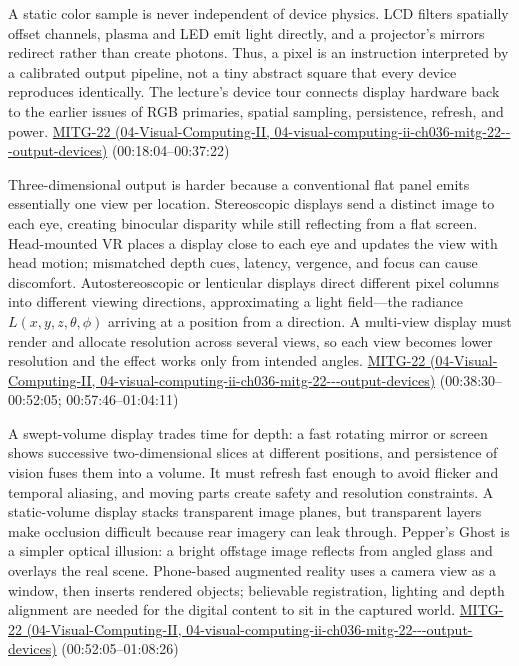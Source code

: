 A static color sample is never independent of device physics. LCD filters spatially offset channels, plasma and LED emit light directly, and a projector's mirrors redirect rather than create photons. Thus, a pixel is an instruction interpreted by a calibrated output pipeline, not a tiny abstract square that every device reproduces identically. The lecture's device tour connects display hardware back to the earlier issues of RGB primaries, spatial sampling, persistence, refresh, and power. \href{../04-Visual-Computing-II/main.pdf\#nameddest=04-visual-computing-ii-ch036-mitg-22---output-devices}{MITG-22 (04-Visual-Computing-II, 04-visual-computing-ii-ch036-mitg-22-\/-\/-output-devices)} (00:18:04--00:37:22)

Three-dimensional output is harder because a conventional flat panel emits essentially one view per location. Stereoscopic displays send a distinct image to each eye, creating binocular disparity while still reflecting from a flat screen. Head-mounted VR places a display close to each eye and updates the view with head motion; mismatched depth cues, latency, vergence, and focus can cause discomfort. Autostereoscopic or lenticular displays direct different pixel columns into different viewing directions, approximating a light field---the radiance \(L(x,y,z,\theta,\phi)\) arriving at a position from a direction. A multi-view display must render and allocate resolution across several views, so each view becomes lower resolution and the effect works only from intended angles. \href{../04-Visual-Computing-II/main.pdf\#nameddest=04-visual-computing-ii-ch036-mitg-22---output-devices}{MITG-22 (04-Visual-Computing-II, 04-visual-computing-ii-ch036-mitg-22-\/-\/-output-devices)} (00:38:30--00:52:05; 00:57:46--01:04:11)

A swept-volume display trades time for depth: a fast rotating mirror or screen shows successive two-dimensional slices at different positions, and persistence of vision fuses them into a volume. It must refresh fast enough to avoid flicker and temporal aliasing, and moving parts create safety and resolution constraints. A static-volume display stacks transparent image planes, but transparent layers make occlusion difficult because rear imagery can leak through. Pepper's Ghost is a simpler optical illusion: a bright offstage image reflects from angled glass and overlays the real scene. Phone-based augmented reality uses a camera view as a window, then inserts rendered objects; believable registration, lighting and depth alignment are needed for the digital content to sit in the captured world. \href{../04-Visual-Computing-II/main.pdf\#nameddest=04-visual-computing-ii-ch036-mitg-22---output-devices}{MITG-22 (04-Visual-Computing-II, 04-visual-computing-ii-ch036-mitg-22-\/-\/-output-devices)} (00:52:05--01:08:26)

